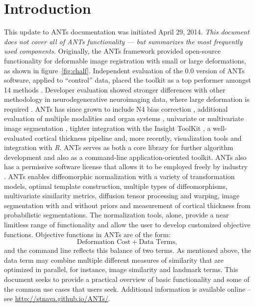 \documentclass{InsightArticle}
\newcommand{\R}{\textit{R}}
\begin{document}
\section{Introduction}
This update to ANTs documentation was initiated April 29, 2014.
\textit{This document does not cover all of ANTs functionality --- but
  summarizes the most frequently used components.}
Originally, the ANTs framework provided open-source functionality for deformable
image registration with small or large deformations, as shown in
figure~\ref{fig:chalf}.  Independent evaluation of the 0.0 version of ANTs software, applied to ``control'' data, 
placed the toolkit as a top performer amongst 14
methods \cite{Klein2009}.  Developer evaluation showed stronger differences 
with other methodology in neurodegenerative neuroimaging data, 
where large deformation is required \cite{Avants2008b}. 
ANTs has since grown to include N4 bias
correction \cite{Tustison2010}, additional evaluation of multiple
modalities and organ systems \cite{Tustison2014,Tustison2011,Murphy2011}, univariate or multivariate image segmentation
\cite{Avants2011,Tustison2011a}, tighter integration with the Insight ToolKit \cite{Tustison2013,AvantsITK}, a
well-evaluated cortical thickness pipeline \cite{Tustison2014b} and, more recently,
visualization tools and integration with \R \cite{Tustison2014c}.
ANTs serves as both a core library for further
algorithm development and also as a command-line application-oriented
toolkit.  ANTs also has a permissive software license that allows it
to be employed freely by industry \cite{rosen2004open}.
ANTs enables diffeomorphic normalization with a variety of
transformation models, optimal template construction, multiple types
of diffeomorphisms, multivariate similarity metrics, diffusion tensor
processing and warping, image segmentation with and without priors and
measurement of cortical thickness from probabilistic segmentations.
The normalization tools, alone, provide a near limitless range of
functionality and allow the user to develop customized objective
functions.  Objective functions in ANTs are of the form: $$
\text{Deformation Cost} + \text{Data Terms},$$ and the command
line reflects this balance of two terms.  As mentioned above, the
data term may combine multiple different measures of
similarity that are optimized in parallel, for instance, image similarity 
and landmark terms.  This document seeks to
provide a practical overview of basic functionality and some of the common use cases that
users seek.
Additional information is available online -- see 
\href{http://stnava.github.io/ANTs/}{http://stnava.github.io/ANTs/}.
\end{document}
